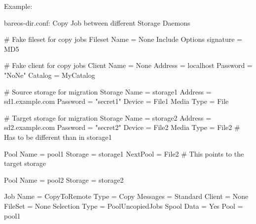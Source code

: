 Example:

\begin{bconfig}{bareos-dir.conf: Copy Job between different Storage Daemons}

# Fake fileset for copy jobs
Fileset {
  Name = None
  Include {
    Options {
      signature = MD5
    }
  }
}

# Fake client for copy jobs
Client {
  Name = None
  Address = localhost
  Password = "NoNe"
  Catalog = MyCatalog
}

# Source storage for migration
Storage {
   Name = storage1
   Address = sd1.example.com
   Password = "secret1"
   Device = File1
   Media Type = File
}

# Target storage for migration
Storage {
   Name = storage2
   Address = sd2.example.com
   Password = "secret2"
   Device = File2
   Media Type = File2   # Has to be different than in storage1
}

Pool {
   Name = pool1
   Storage = storage1
   NextPool = File2    # This points to the target storage
}

Pool {
   Name = pool2
   Storage = storage2
}

Job {
   Name = CopyToRemote
   Type = Copy
   Messages = Standard
   Client = None
   FileSet = None
   Selection Type = PoolUncopiedJobs
   Spool Data = Yes
   Pool = pool1
}
\end{bconfig}
